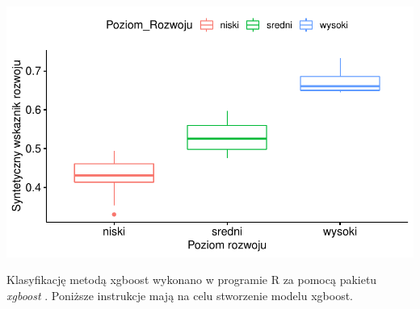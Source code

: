 \documentclass{amuthesis}
\begin{document}
\begin{center}\includegraphics[width=1\linewidth]{figures/unnamed-chunk-27-1} \end{center}

Klasyfikację metodą xgboost wykonano w programie R za pomocą pakietu \emph{xgboost} \autocite{R-xgboost}. Poniższe instrukcje mają na celu stworzenie modelu xgboost.
\end{document}
